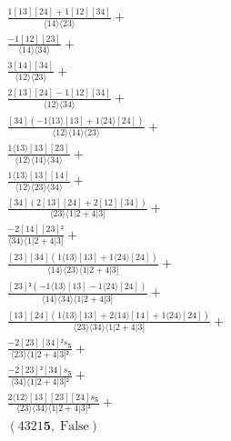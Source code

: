 \documentclass[varwidth, border=5pt]{standalone}
\begin{document}
\begin{my}
$\begin{gathered}
\scriptscriptstyle\frac{1[13][24]+1[12][34]}{⟨14⟩⟨23⟩} +\\
\scriptscriptstyle\frac{-1[12][23]}{⟨14⟩⟨34⟩} +\\
\scriptscriptstyle\frac{3[14][34]}{⟨12⟩⟨23⟩} +\\
\scriptscriptstyle\frac{2[13][24]-1[12][34]}{⟨12⟩⟨34⟩} +\\
\scriptscriptstyle\frac{[34](-1⟨13⟩[13]+1⟨24⟩[24])}{⟨12⟩⟨14⟩⟨23⟩} +\\
\scriptscriptstyle\frac{1⟨13⟩[13][23]}{⟨12⟩⟨14⟩⟨34⟩} +\\
\scriptscriptstyle\frac{1⟨13⟩[13][14]}{⟨12⟩⟨23⟩⟨34⟩} +\\
\scriptscriptstyle\frac{[34](2[13][24]+2[12][34])}{⟨23⟩⟨1|2+4|3]} +\\
\scriptscriptstyle\frac{-2[14][23]²}{⟨34⟩⟨1|2+4|3]} +\\
\scriptscriptstyle\frac{[23][34](1⟨13⟩[13]+1⟨24⟩[24])}{⟨14⟩⟨23⟩⟨1|2+4|3]} +\\
\scriptscriptstyle\frac{[23]²(-1⟨13⟩[13]-1⟨24⟩[24])}{⟨14⟩⟨34⟩⟨1|2+4|3]} +\\
\scriptscriptstyle\frac{[13][24](1⟨13⟩[13]+2⟨14⟩[14]+1⟨24⟩[24])}{⟨23⟩⟨34⟩⟨1|2+4|3]} +\\
\scriptscriptstyle\frac{-2[23][34]²s_{𝟓}}{⟨23⟩⟨1|2+4|3]²} +\\
\scriptscriptstyle\frac{-2[23]²[34]s_{𝟓}}{⟨34⟩⟨1|2+4|3]²} +\\
\scriptscriptstyle\frac{2⟨12⟩[13][23][24]s_{𝟓}}{⟨23⟩⟨34⟩⟨1|2+4|3]²} +\\
\scriptscriptstyle(4321𝟓,\;\text{False}) \phantom{+}
\end{gathered}$
\end{my}
\end{document}
